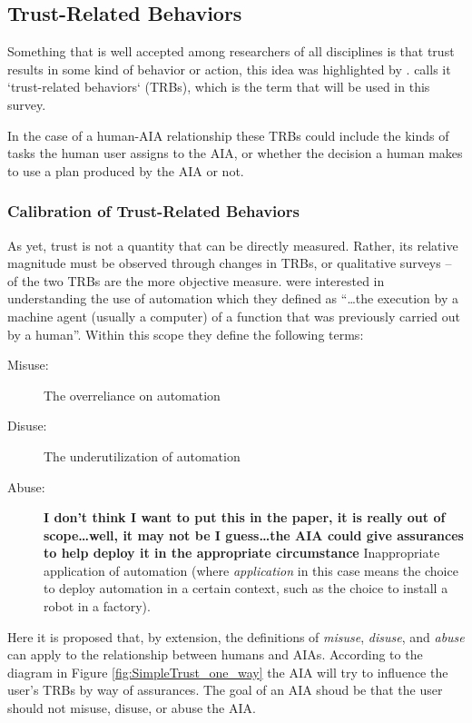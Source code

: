 \subsection{Trust-Related Behaviors} \label{sec:trbs}
Something that is well accepted among researchers of all disciplines is that trust results in some kind of behavior or action, this idea was highlighted by \citet{Lewis1985-pr}.  \citet{McKnight2001-fa} calls it `trust-related behaviors` (TRBs), which is the term that will be used in this survey.

In the case of a human-AIA relationship these TRBs could include the kinds of tasks the human user assigns to the AIA, or whether the decision a human makes to use a plan produced by the AIA or not. 

\subsubsection{Calibration of Trust-Related Behaviors}
    As yet, trust is not a quantity that can be directly measured. Rather, its relative magnitude must be observed through changes in TRBs, or qualitative surveys -- of the two TRBs are the more objective measure. \citet{Parasuraman1997-co} were interested in understanding the use of automation which they defined as ``\ldots the execution by a machine agent (usually a computer) of a function that was previously carried out by a human''. Within this scope they define the following terms:
    
    \begin{description}
        \item [Misuse:] The overreliance on automation
        \item [Disuse:] The underutilization of automation
        \item [Abuse:] \textbf{I don't think I want to put this in the paper, it is really out of scope\ldots well, it may not be I guess\ldots the AIA could give assurances to help deploy it in the appropriate circumstance} Inappropriate application of automation (where \emph{application} in this case means the choice to deploy automation in a certain context, such as the choice to install a robot in a factory).
    \end{description}

    Here it is proposed that, by extension, the definitions of \emph{misuse}, \emph{disuse}, and \emph{abuse} can apply to the relationship between humans and AIAs. According to the diagram in Figure \ref{fig:SimpleTrust_one_way} the AIA will try to influence the user's TRBs by way of assurances. The goal of an AIA shoud be that the user should not misuse, disuse, or abuse the AIA.
    
